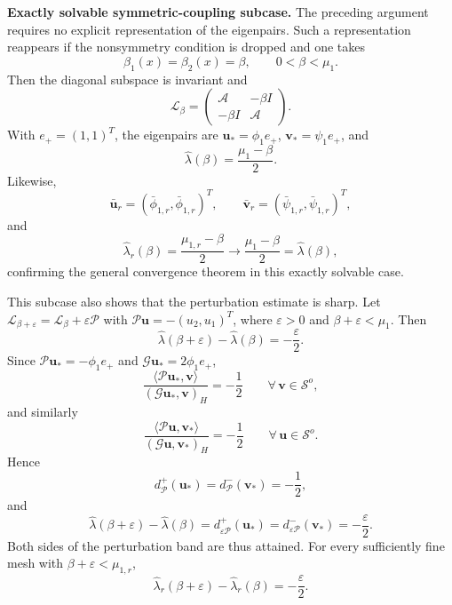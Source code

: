 \documentclass[preprint,10pt]{elsarticle}
\theoremstyle{plain}
\theoremstyle{definition}
\theoremstyle{remark}
\begin{document}
\medskip
\noindent\textbf{Exactly solvable symmetric-coupling subcase.}
The preceding argument requires no explicit representation of the eigenpairs.
Such a representation reappears if the nonsymmetry condition is dropped and
one takes
\[
\beta_1(x)=\beta_2(x)=\beta,\qquad 0<\beta<\mu_1.
\]
Then the diagonal subspace is invariant and
\[
\mathcal L_\beta
=
\begin{pmatrix}\mathcal A&-\beta I\\-\beta I&\mathcal A\end{pmatrix}.
\]
With $e_+=(1,1)^T$, the eigenpairs are
$\mathbf u_*=\phi_1e_+$, $\mathbf v_*=\psi_1e_+$, and
\begin{equation}\label{eq:complete-model-explicit-continuous-value}
	\hat\lambda(\beta)=\frac{\mu_1-\beta}{2}.
\end{equation}
Likewise,
\[
\bar{\mathbf u}_r=(\bar\phi_{1,r},\bar\phi_{1,r})^T,
\qquad
\bar{\mathbf v}_r=(\bar\psi_{1,r},\bar\psi_{1,r})^T,
\]
and
\begin{equation}\label{eq:complete-model-explicit-discrete-value}
	\hat\lambda_r(\beta)=\frac{\mu_{1,r}-\beta}{2}
	\longrightarrow
	\frac{\mu_1-\beta}{2}
	=
	\hat\lambda(\beta),
\end{equation}
confirming the general convergence theorem in this exactly solvable case.

This subcase also shows that the perturbation estimate is sharp. Let
$\mathcal L_{\beta+\varepsilon}=\mathcal L_\beta+\varepsilon\mathcal P$ with
$\mathcal P\mathbf u=-(u_2,u_1)^T$, where $\varepsilon>0$ and
$\beta+\varepsilon<\mu_1$. Then
\[
\hat\lambda(\beta+\varepsilon)-\hat\lambda(\beta)=-\frac{\varepsilon}{2}.
\]
Since $\mathcal P\mathbf u_*=-\phi_1e_+$ and
$\mathcal G\mathbf u_*=2\phi_1e_+$,
\[
\frac{\langle\mathcal P\mathbf u_*,\mathbf v\rangle}
{(\mathcal G\mathbf u_*,\mathbf v)_H}
=
-\frac12
\qquad\forall\,\mathbf v\in\mathcal S^o,
\]
and similarly
\[
\frac{\langle\mathcal P\mathbf u,\mathbf v_*\rangle}
{(\mathcal G\mathbf u,\mathbf v_*)_H}
=
-\frac12
\qquad\forall\,\mathbf u\in\mathcal S^o.
\]
Hence
\[
d_{\mathcal P}^+(\mathbf u_*)=
d_{\mathcal P}^-(\mathbf v_*)=-\frac12,
\]
and
\begin{equation}\label{eq:complete-model-sharpness}
	\hat\lambda(\beta+\varepsilon)-\hat\lambda(\beta)
	=
	d_{\varepsilon\mathcal P}^+(\mathbf u_*)
	=
	d_{\varepsilon\mathcal P}^-(\mathbf v_*)
	=
	-\frac{\varepsilon}{2}.
\end{equation}
Both sides of the perturbation band are thus attained. For every sufficiently
fine mesh with $\beta+\varepsilon<\mu_{1,r}$,
\[
\hat\lambda_r(\beta+\varepsilon)-\hat\lambda_r(\beta)
=
-\frac{\varepsilon}{2}.
\]
\end{document}
